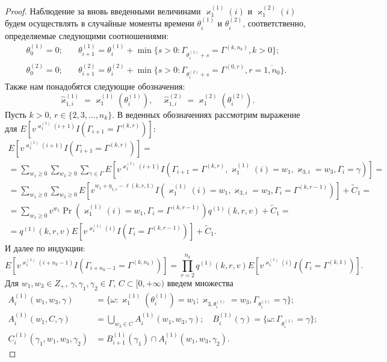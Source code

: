 \documentclass{report}
\begin{document}
\begin{proof}
Наблюдение за вновь введенными величинами $\varkappa_{1}^{(1)}(i)$ и $\varkappa_{1}^{(2)}(i)$ будем осуществлять в случайные моменты времени $\theta_{i}^{(1)}$ и $\theta_{i}^{(2)}$, соответственно, определяемые следующими соотношениями:
\begin{equation}
\begin{aligned}
  \theta_{0}^{(1)}=0; & \quad \theta_{i+1}^{(1)}=\theta_{i}^{(1)} + \min{\{s>0\colon \Gamma_{\theta_{i}^{(1)}+s} = \Gamma^{(k,n_k)}, k>0\}};\\
  \theta_{0}^{(2)}=0; & \quad  \theta_{i+1}^{(2)}=\theta_{i}^{(2)} + \min{\{s>0\colon \Gamma_{\theta_{i}^{(2)}+s} = \Gamma^{(0,r)}, r=\overline{1,n_0}\}}.
  \label{stop:times}
\end{aligned}
\end{equation}
Также нам понадобятся следующие обозначения:
\begin{equation}
  \hat{\varkappa}_{1,i}^{(1)}=\varkappa_{1}^{(1)}(\theta_{i}^{(1)}), \quad   \hat{\varkappa}_{1,i}^{(2)}=\varkappa_{1}^{(2)}(\theta_{i}^{(2)}).
  \label{stop:queue}
\end{equation}
Пусть $k>0$, $r \in \{2, 3, \ldots, n_k\}$. В веденных обозначениях рассмотрим выражение для $E[v^{\varkappa_{1}^{(1)}(i+1)} I(\Gamma_{i+1}=\Gamma^{(k,r)})]$:
\begin{multline*}
  E[v^{\varkappa_{1}^{(1)}(i+1)} I(\Gamma_{i+1}=\Gamma^{(k,r)})] = \\ =\sum_{w_1 \geqslant 0} \sum_{w_3 \geqslant 0} \sum_{\gamma \in \Gamma} E[v^{\varkappa_{1}^{(1)}(i+1)} I(\Gamma_{i+1}=\Gamma^{(k,r)}, \varkappa_{1}^{(1)}(i)=w_1, \varkappa_{3,i}=w_3,\Gamma_i=\gamma)] =\\= \sum_{w_1\geqslant 0} \sum_{w_3\geqslant 0} E[v^{w_1 + \eta_{1,i}-\ell(k,r,1)} I(\varkappa_{1}^{(1)}(i)=w_1, \varkappa_{3,i}=w_3,\Gamma_i=\Gamma^{(k,r-1)})] + \widetilde{C}_1=\\
  =\sum_{w_1\geqslant 0} v^{w_1 } \Pr (\varkappa_{1}^{(1)}(i)=w_1, \Gamma_i=\Gamma^{(k,r-1)}) q^{(1)}(k,r,v) + \widetilde{C}_1 = \\
  =q^{(1)}(k,r,v) E[v^{\varkappa_{1}^{(1)}(i)} I(\Gamma_i=\Gamma^{(k,r-1)})] + \widetilde{C}_1.
\end{multline*}
И далее по индукции:
\begin{equation*}
  E[v^{\varkappa_{1}^{(1)}(i+n_k-1)} I(\Gamma_{i+n_k-1}=\Gamma^{(k,n_k)})] = \prod_{r=2}^{n_k} q^{(1)}(k,r,v) E[v^{\varkappa_{1}^{(1)}(i)} I(\Gamma_{i}=\Gamma^{(k,1)})].
\end{equation*}
Для $w_1, w_3 \in Z_+$, $\gamma, \gamma_1, \gamma_2 \in \Gamma$, $C \subset [0, +\infty)$ введем множества 
\begin{align*}
  A_i^{(1)}(w_1,w_3,\gamma) &= \{\omega\colon \varkappa_{1}^{(1)}(\theta_{i}^{(1)})=w_1; \varkappa_{3,\theta_{i}^{(1)}}=w_3, \Gamma_{\theta_{i}^{(1)}}=\gamma\};\\
  A_i^{(1)}(w_1,C,\gamma) &= \bigcup_{w_3 \in C} A_i^{(1)}(w_1,w_3,\gamma);\quad B_i^{(1)}(\gamma) =\{\omega\colon \Gamma_{\theta_{i}^{(1)}}=\gamma\};\\
  C_i^{(1)}(\gamma_1,w_1,w_3,\gamma_2)&= B_{i+1}^{(1)}(\gamma_1) \cap A_i^{(1)}(w_1,w_3,\gamma_2) .
\end{align*}


\end{proof}
\end{document}
